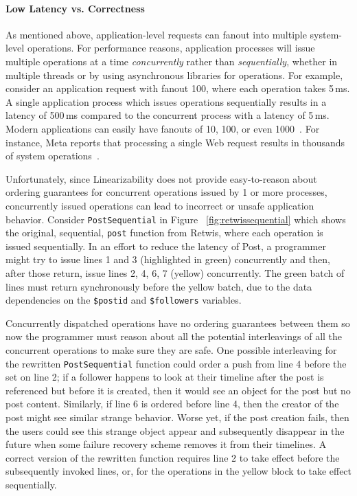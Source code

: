 \paragraph{Low Latency vs. Correctness}
As mentioned above, application-level requests can fanout into multiple system-level operations. For performance reasons, application processes will issue multiple operations at a time \textit{concurrently} rather than \textit{sequentially}, whether in multiple threads or by using asynchronous libraries for operations. For example, consider an application request with fanout 100, where each operation takes 5\,ms. A single application process which issues operations sequentially results in a latency of 500\,ms compared to the concurrent process with a latency of 5\,ms.
Modern applications can easily have fanouts of 10, 100, or even 1000~\cite{dean2013tail}. For instance, Meta reports that processing a single Web request results in thousands of system operations~\cite{ajoux2015challenges}.

Unfortunately, since Linearizability does not provide easy-to-reason about ordering guarantees for concurrent operations issued by 1 or more processes, concurrently issued operations can lead to incorrect or unsafe application behavior. Consider \texttt{PostSequential} in Figure ~\ref{fig:retwissequential} which shows the original, sequential, \texttt{post} function from Retwis, where each operation is issued sequentially. In an effort to reduce the latency of Post, a programmer might try to issue lines 1 and 3 (highlighted in green) concurrently and then, after those return, issue lines 2, 4, 6, 7 (yellow) concurrently. The green batch of lines must return synchronously before the yellow batch, due to the data dependencies on the \texttt{\$postid} and \texttt{\$followers} variables.

Concurrently dispatched operations have no ordering guarantees between them so now the programmer must reason about all the potential interleavings of all the concurrent operations to make sure they are safe. One possible interleaving for the rewritten \texttt{PostSequential} function could order a push from line 4 before the set on line 2; if a follower happens to look at their timeline after the post is referenced but before it is created, then it would see an object for the post but no post content. Similarly, if line 6 is ordered before line 4, then the creator of the post might see similar strange behavior. Worse yet, if the post creation fails, then the users could see this strange object appear and subsequently disappear in the future when some failure recovery scheme removes it from their timelines. A correct version of the rewritten function requires line 2 to take effect before the subsequently invoked lines, or, for the operations in the yellow block to take effect sequentially.


